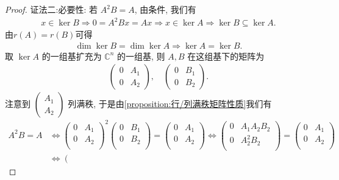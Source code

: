 \documentclass[../../main.tex]{subfiles}%
\begin{document}
\begin{proof}
{\color{blue}证法二:}{\heiti 必要性:} 
若 \(A^2B = A\), 由条件, 我们有
\begin{align*}
x \in \ker B \Longrightarrow 0 = A^2Bx = Ax \Longrightarrow x \in \ker A \Longrightarrow \ker B \subseteq \ker A.
\end{align*}
由$r(A)=r(B)$可得
\begin{align*}
\dim \ker B = \dim \ker A \Longrightarrow \ker A = \ker B.
\end{align*}
取 \(\ker A\) 的一组基扩充为 \(\mathbb{C}^n\) 的一组基, 则 \(A,B\) 在这组基下的矩阵为
\begin{align*}
\begin{pmatrix} 0 & A_1 \\ 0 & A_2 \end{pmatrix}, \quad \begin{pmatrix} 0 & B_1 \\ 0 & B_2 \end{pmatrix}.
\end{align*}
注意到 \(\begin{pmatrix} A_1 \\ A_2 \end{pmatrix}\) 列满秩, 于是由\cref{proposition:行/列满秩矩阵性质}我们有
\begin{align*}
A^2B=A&\Longleftrightarrow \left( \begin{matrix}
0&		A_1\\
0&		A_2\\
\end{matrix} \right) ^2\left( \begin{matrix}
0&		B_1\\
0&		B_2\\
\end{matrix} \right) =\left( \begin{matrix}
0&		A_1\\
0&		A_2\\
\end{matrix} \right) \Longleftrightarrow \left( \begin{matrix}
0&		A_1A_2B_2\\
0&		A_{2}^{2}B_2\\
\end{matrix} \right) =\left( \begin{matrix}
0&		A_1\\
0&		A_2\\
\end{matrix} \right) 
\\
&\Longleftrightarrow \left( \begin{array}{c}

\end{array}
\end{align*}
\end{proof}
\end{document}
